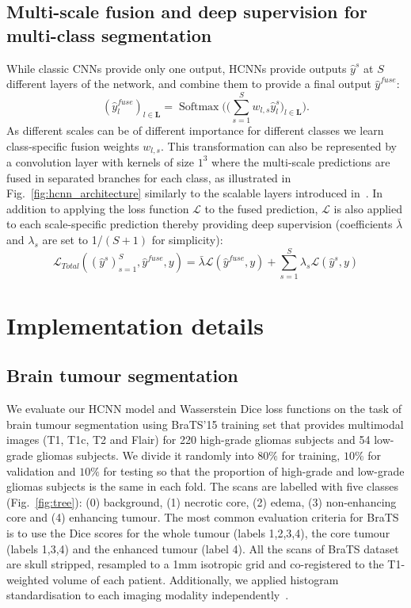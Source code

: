 \documentclass[runningheads,orivec,a4paper]{llncs}
\DeclareMathOperator{\Softmax}{Softmax}
\begin{document}
\subsection{Multi-scale fusion and deep supervision for multi-class segmentation}
While classic CNNs provide only one output, HCNNs
provide outputs $\hat{y}^{s}$ at $S$ different layers of the network,
and combine them to provide a final output $\hat{y}^{fuse}$: 
\[
(\hat{y}_{l}^{fuse})_{l \in \mathbf{L}} = \Softmax\Big(\big(\sum_{s=1}^{S} w_{l,s} \hat{y}_{l}^{s}\big)_{l \in \mathbf{L}}\Big).
\]
As different scales can be of different importance for different
classes we learn class-specific fusion weights $w_{l,s}$. 
This transformation can also be represented by a convolution layer
with kernels of size $1^3$ where the multi-scale
predictions are fused in separated branches for each class, as
illustrated in Fig.~\ref{fig:hcnn_architecture} similarly to the
scalable layers introduced in~\cite{scalenet}. 
In addition to applying the loss function $\mathcal{L}$ to the fused
prediction, $\mathcal{L}$ is also applied to each scale-specific
prediction thereby providing deep supervision (coefficients $\bar{\lambda}$ and $\lambda_{s}$ are set to 1/$(S+1)$ for simplicity):
\[
\mathcal{L}_{Total}((\hat{y}^{s})_{s=1}^{S}, \hat{y}^{fuse}, y) = \bar{\lambda}\mathcal{L}(\hat{y}^{fuse}, y) + \sum_{s=1}^{S} \lambda_{s}\mathcal{L}(\hat{y}^{s}, y)
\]


\section{Implementation details}

\subsection{Brain tumour segmentation}
We evaluate our HCNN model and Wasserstein Dice loss functions on the
task of brain tumour segmentation using BraTS'15 training set that
provides multimodal images (T1, T1c, T2 and Flair) for 220 high-grade
gliomas subjects and 54 low-grade gliomas subjects.  We divide it
randomly into $80\%$ for training, $10\%$ for validation and $10\%$
for testing so that the proportion of high-grade and low-grade gliomas
subjects is the same in each fold. 
The scans are labelled with five classes (Fig.~\ref{fig:tree}): (0)
background, (1) necrotic core, (2) edema, (3) non-enhancing core and
(4) enhancing tumour. The most common evaluation criteria for BraTS is
to use the Dice scores for the whole tumour (labels 1,2,3,4), the core
tumour (labels 1,3,4) and the enhanced tumour (label 4). 
All the scans of BraTS dataset are skull stripped,
resampled to a 1mm isotropic grid and co-registered to the T1-weighted volume of each patient. 
Additionally, we applied histogram standardisation to each
imaging modality independently~\cite{histStd}.
\end{document}
